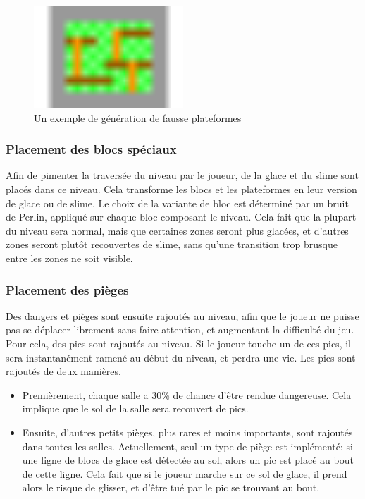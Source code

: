\documentclass[10pt]{report}
\begin{document}
\begin{figure}[H]
  \centering
  \includegraphics[width=0.5\textwidth]{images/fake_platforms}
  \caption{Un exemple de génération de fausse plateformes}
  \label{fig:fake_platforms}
\end{figure}

\subsubsection{Placement des blocs spéciaux}

Afin de pimenter la traversée du niveau par le joueur, de la glace et du 
slime sont placés dans ce niveau.
Cela transforme les blocs et les plateformes en leur version de glace ou de slime.
Le choix de la variante de bloc est déterminé par un bruit de Perlin, appliqué sur chaque bloc
composant le niveau.
Cela fait que la plupart du niveau sera normal, mais que certaines zones seront plus glacées,
et d'autres zones seront plutôt recouvertes de slime,
sans qu'une transition trop brusque entre les zones ne soit visible.

\subsubsection{Placement des pièges}

Des dangers et pièges sont ensuite rajoutés au niveau, afin que le joueur ne puisse pas se déplacer librement sans
faire attention, et augmentant la difficulté du jeu.
Pour cela, des pics sont rajoutés au niveau.
Si le joueur touche un de ces pics, il sera instantanément ramené au début du niveau, et perdra une vie.
Les pics sont rajoutés de deux manières.
\begin{itemize}
  \item Premièrement, chaque salle a 30\% de chance d'être rendue dangereuse.
  Cela implique que le sol de la salle sera recouvert de pics.
  \item Ensuite, d'autres petits pièges, plus rares et moins importants, sont rajoutés dans toutes les salles.
  Actuellement, seul un type de piège est implémenté: si une ligne de blocs de glace est détectée au sol, alors
  un pic est placé au bout de cette ligne.
  Cela fait que si le joueur marche sur ce sol de glace, il prend alors le risque de glisser, et d'être tué par le
  pic se trouvant au bout.
\end{itemize}
\end{document}
